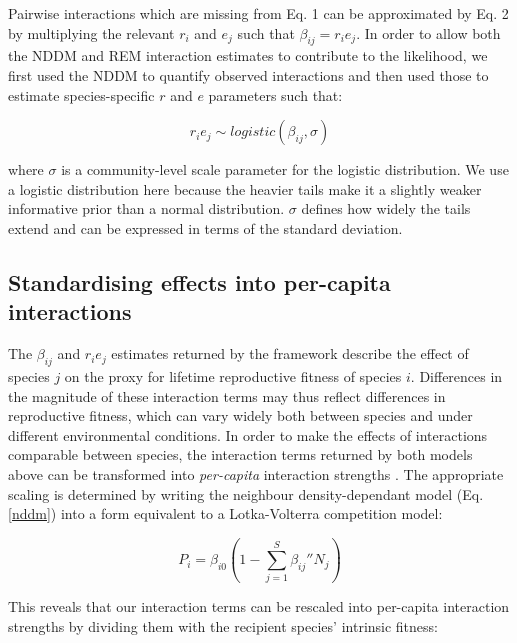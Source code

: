 \documentclass[a4,12pt]{article}
\begin{document}
\begin{itemize}
        Pairwise interactions which are missing from Eq. 1 can be approximated by Eq. 2 by multiplying the relevant $r_{i}$ and $e_{j}$ such that $\beta_{ij} = r_{i} e_{j}$. In order to allow both the NDDM and REM interaction estimates to contribute to the likelihood, we first used the NDDM to quantify observed interactions and then used those to estimate species-specific $r$ and $e$ parameters such that: 
    
        \begin{equation}
        r_i e_j \sim logistic \left ( \beta_{ij}, \sigma \right )
        \label{unrealised}
        \end{equation}
    
        where $\sigma$ is a community-level scale parameter for the logistic distribution. We use a logistic distribution here because the heavier tails make it a slightly weaker informative prior than a normal distribution. $\sigma$ defines how widely the tails extend and can be expressed in terms of the standard deviation. 

    \subsection{Standardising effects into per-capita interactions}

        The $\beta_{ij}$ and $r_i e_j$ estimates returned by the framework describe the effect of species $j$ on the proxy for lifetime reproductive fitness of species $i$. Differences in the magnitude of these interaction terms may thus reflect differences in reproductive fitness, which can vary widely both between species and under different environmental conditions. In order to make the effects of interactions comparable between species, the interaction terms returned by both models above can be transformed into \textit{per-capita} interaction strengths \parencite{Godoy2014, Bimler2018}. The appropriate scaling is determined by writing the neighbour density-dependant model (Eq. \ref{nddm}) into a form equivalent to a Lotka-Volterra competition model: 

        \begin{equation}
        P_{i} = \beta_{i0} \left ( 1 - \sum_{j=1}^{S} {\beta_{ij}}'' N_{j} \right )
        \label{LVform}
        \end{equation}

        This reveals that our interaction terms can be rescaled into per-capita interaction strengths by dividing them with the recipient species' intrinsic fitness:  


\end{itemize}
\end{document}
